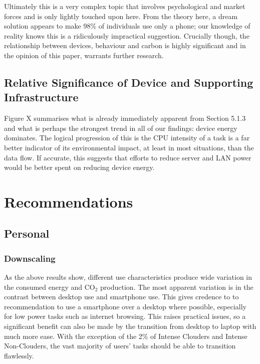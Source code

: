 \documentclass[conference]{IEEEtran}
\begin{document}
Ultimately this is a very complex topic that involves psychological
and market forces and is only lightly touched upon here. From the
theory here, a dream solution appears to make 98\% of individuals use
only a phone; our knowledge of reality knows this is a ridiculously
impractical suggestion. Crucially though, the relationship between
devices, behaviour and carbon is highly significant and in the opinion
of this paper, warrants further research.

\subsection{Relative Significance of Device and Supporting
  Infrastructure}

Figure X summarises what is already immediately apparent from Section
5.1.3 and what is perhaps the strongest trend in all of our findings:
device energy dominates. The logical progression of this is the CPU
intensity of a task is a far better indicator of its environmental
impact, at least in most situations, than the data flow.  If accurate,
this suggests that efforts to reduce server and LAN power would be
better spent on reducing device energy.

\section{Recommendations}

\subsection{Personal}

\subsubsection{Downscaling}

As the above results show, different use characteristics produce wide
variation in the consumed energy and CO$_2$ production. The most apparent
variation is in the contrast between desktop use and smartphone
use. This gives credence to to recommendation to use a smartphone over
a desktop where possible, especially for low power tasks such as
internet browsing. This raises practical issues, so a significant
benefit can also be made by the transition from desktop to laptop with
much more ease. With the exception of the 2\% of Intense Clouders and
Intense Non-Clouders, the vast majority of users’ tasks should be able
to transition flawlessly.
\end{document}
